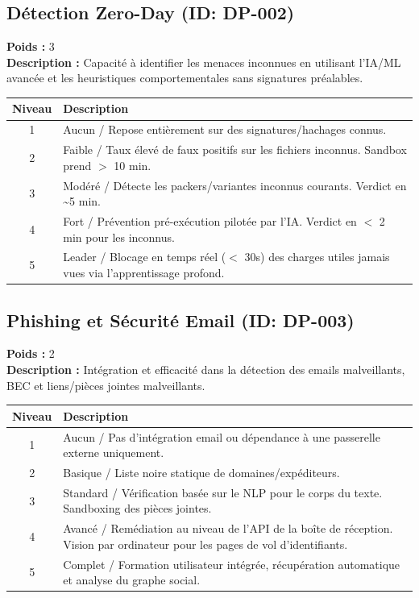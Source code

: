 \documentclass{article}
\begin{document}
\subsection{Détection Zero-Day (ID: DP-002)}
\textbf{Poids :} 3 \\
\textbf{Description :} Capacité à identifier les menaces inconnues en utilisant l'IA/ML avancée et les heuristiques comportementales sans signatures préalables.
\vspace{0.3cm}
\begin{longtable}{|c|p{12cm}|}
\hline
\rowcolor{lightgray} \textbf{Niveau} & \textbf{Description} \\ \hline
1 & Aucun / Repose entièrement sur des signatures/hachages connus. \\ \hline
2 & Faible / Taux élevé de faux positifs sur les fichiers inconnus. Sandbox prend $>$ 10 min. \\ \hline
3 & Modéré / Détecte les packers/variantes inconnus courants. Verdict en \textasciitilde{}5 min. \\ \hline
4 & Fort / Prévention pré-exécution pilotée par l'IA. Verdict en $<$ 2 min pour les inconnus. \\ \hline
5 & Leader / Blocage en temps réel ($<$ 30s) des charges utiles jamais vues via l'apprentissage profond. \\ \hline
\end{longtable}
\vspace{0.5cm}
\subsection{Phishing et Sécurité Email (ID: DP-003)}
\textbf{Poids :} 2 \\
\textbf{Description :} Intégration et efficacité dans la détection des emails malveillants, BEC et liens/pièces jointes malveillants.
\vspace{0.3cm}
\begin{longtable}{|c|p{12cm}|}
\hline
\rowcolor{lightgray} \textbf{Niveau} & \textbf{Description} \\ \hline
1 & Aucun / Pas d'intégration email ou dépendance à une passerelle externe uniquement. \\ \hline
2 & Basique / Liste noire statique de domaines/expéditeurs. \\ \hline
3 & Standard / Vérification basée sur le NLP pour le corps du texte. Sandboxing des pièces jointes. \\ \hline
4 & Avancé / Remédiation au niveau de l'API de la boîte de réception. Vision par ordinateur pour les pages de vol d'identifiants. \\ \hline
5 & Complet / Formation utilisateur intégrée, récupération automatique et analyse du graphe social. \\ \hline
\end{longtable}
\vspace{0.5cm}
\end{document}
